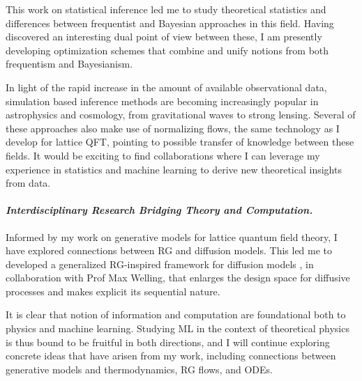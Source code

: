 \documentclass[12pt]{article}
\begin{document}
This work on statistical inference led me to study theoretical statistics and differences between frequentist and Bayesian approaches in this field.
Having discovered an interesting dual point of view between these, I am presently developing optimization schemes that combine and unify notions from both frequentism and Bayesianism.

\textbf{\color{royalblue}{Future Directions.}}
In light of the rapid increase in the amount of available observational data, simulation based inference methods are becoming increasingly popular in astrophysics and cosmology, from gravitational waves to strong lensing.
Several of these approaches also make use of normalizing flows, the same technology as I develop for lattice QFT, pointing to possible transfer of knowledge between these fields.
It would be exciting to find collaborations where I can leverage my experience in statistics and machine learning to derive new theoretical insights from data.

\paragraph{\textit{{Interdisciplinary Research Bridging Theory and Computation.}}}
Informed by my work on generative models for lattice quantum field theory, I have explored connections between RG and diffusion models.
This led me to developed a generalized RG-inspired framework for diffusion models \cite{gerdes2024gudgenerationunifieddiffusion}, in collaboration with Prof Max Welling, that enlarges the design space for diffusive processes and makes explicit its sequential nature.

\textbf{\color{royalblue}{Future Directions.}}
It is clear that notion of information and computation are foundational both to physics and machine learning.
Studying ML in the context of theoretical physics is thus bound to be fruitful in both directions, and I will continue exploring concrete ideas that have arisen from my work, including connections between generative models and thermodynamics, RG flows, and ODEs.



{
    \small
    
}
\end{document}

